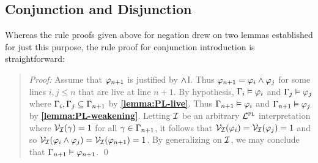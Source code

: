 






\subsection{Conjunction and Disjunction}%
  \label{sub:ConjunctionDisjunction}

Whereas the rule proofs given above for negation drew on two lemmas established for just this purpose, the rule proof for conjunction introduction is straightforward:

  
\begin{quote} 
  \textit{Proof:} Assume that $\varphi_{n+1}$ is justified by $\wedge$I.
  Thus $\varphi_{n+1}=\varphi_i\wedge\varphi_j$ for some lines $i,j\leq n$ that are live at line $n+1$.
  By hypothesis, $\Gamma_i\vDash \varphi_i$ and $\Gamma_j\vDash \varphi_j$ where $\Gamma_i,\Gamma_j\subseteq \Gamma_{n+1}$ by \textbf{\ref{lemma:PL-live}}.
  Thus $\Gamma_{n+1} \vDash \varphi_i$ and $\Gamma_{n+1} \vDash \varphi_j$ by \textbf{\ref{lemma:PL-weakening}}.
  Letting $\mathcal{I}$ be an arbitrary $\mathcal{L}^{\textsc{pl}}$ interpretation where $\mathcal{V}_{\mathcal{I}}(\gamma) = 1$ for all $\gamma \in \Gamma_{n+1}$, it follows that $\mathcal{V}_{\mathcal{I}}(\varphi_i) = \mathcal{V}_{\mathcal{I}}(\varphi_j) = 1$ and so $\mathcal{V}_{\mathcal{I}}(\varphi_i \wedge \varphi_j) = \mathcal{V}_{\mathcal{I}}(\varphi_{n+1}) = 1$.
  By generalizing on $\mathcal{I}$, we may conclude that $\Gamma_{n+1} \vDash \varphi_{n+1}$.
  \qed
\end{quote}


